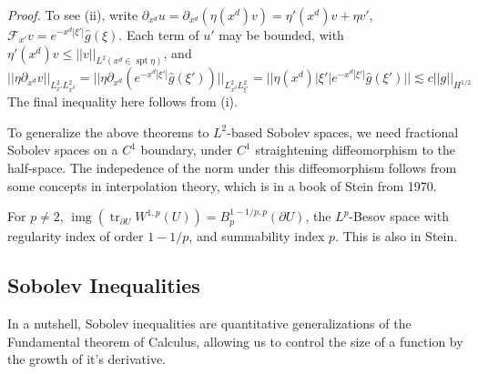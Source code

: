 \documentclass[letterpaper,10pt]{article}
\newcommand{\lsim}{\lesssim}
\DeclareMathOperator{\spt}{spt}
\DeclareMathOperator{\img}{img}
\DeclareMathOperator{\tr}{tr}
\theoremstyle{definition}
\theoremstyle{remark}
\theoremstyle{plain}
\renewenvironment{proof}{
    \vspace{5pt}
    \begin{mdframed}[bottomline=false,topline=false,rightline=false, skipabove=0]
    \noindent\textit{Proof.}}
{
    \hspace{\fill}\qedsymbol
    \end{mdframed}
}
\begin{document}
\begin{proof}
    To see (ii), write $\partial_{x^d}u=\partial_{x^d}(\eta(x^d)v)=\eta'(x^d)v+\eta v'$, 
    $\mathcal F_{x'}v=e^{-x^d|\xi'|}\hat g(\xi)$.
    Each term of $u'$ may be bounded, with $\eta'(x^d)v\leq ||v||_{L^2(x^d\in\spt\eta)}$,
    and
    $$
    ||\eta\partial_{x^d}v||_{L^2_{x'}L^2_{x^d}}=||\eta\partial_{x^d}(e^{-x^d|\xi'|}\hat g(\xi'))||_{L^2_{x^d}L^2_{\xi'}}
    =||\eta(x^d)|\xi'|e^{-x^d|\xi'|}\hat g(\xi')||
    \lsim c||g||_{H^{1/2}}
    $$
    The final inequality here follows from (i). 
\end{proof}

To generalize the above theorems to $L^2$-based Sobolev spaces, we need
fractional Sobolev spaces on a $C^1$ boundary, under $C^1$ straightening
diffeomorphism to the half-space. The indepedence of the norm under this 
diffeomorphism follows from some concepts in interpolation theory, which is
in a book of Stein from 1970.

For $p\neq 2$, $\img(\tr_{\partial U}W^{1,p}(U))=B^{1-1/p,p}_p(\partial U)$,
the $L^p$-Besov space with regularity index of order $1-1/p$, and summability
index $p$. This is also in Stein.

\subsection{Sobolev Inequalities}
In a nutshell, Sobolev inequalities are quantitative generalizations of the 
Fundamental theorem of Calculus, allowing us to control the 
size of a function by the growth of it's derivative.
\end{document}
